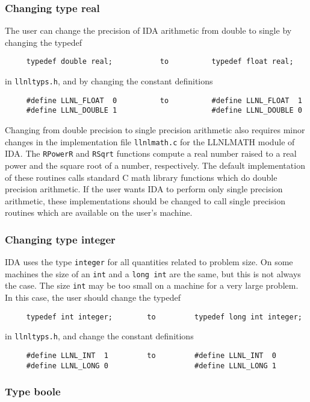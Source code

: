 \subsubsection{Changing type real}

The user can change the precision of IDA arithmetic from double to single
by changing the typedef 
\begin{verbatim}
     typedef double real;           to          typedef float real;
\end{verbatim}
in {\tt llnltyps.h}, and by changing the constant definitions
\begin{verbatim}
     #define LLNL_FLOAT  0          to          #define LLNL_FLOAT  1
     #define LLNL_DOUBLE 1                      #define LLNL_DOUBLE 0
\end{verbatim}

Changing from double precision to single precision arithmetic also
requires minor changes in the implementation file {\tt llnlmath.c} for
the LLNLMATH module of IDA. The {\tt RPowerR} and {\tt RSqrt}
functions compute a real number raised to a real power and the square
root of a number, respectively. The default implementation of these
routines calls standard C math library functions which do double
precision arithmetic.  If the user wants IDA to perform only single
precision arithmetic, these implementations should be changed to call
single precision routines which are available on the user's machine.


\subsubsection{Changing type integer}

IDA uses the type {\tt integer} for all quantities related to problem
size.  On some machines the size of an {\tt int} and a {\tt long int}
are the same, but this is not always the case.  The size {\tt int} may
be too small on a machine for a very large problem.  In this case, the
user should change the typedef
\begin{verbatim} 
     typedef int integer;        to         typedef long int integer;
\end{verbatim}
in {\tt llnltyps.h}, and change the constant definitions  
\begin{verbatim}
     #define LLNL_INT  1         to         #define LLNL_INT  0
     #define LLNL_LONG 0                    #define LLNL_LONG 1
\end{verbatim}


\subsubsection{Type boole}

